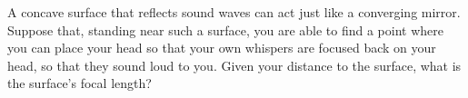 A concave surface that reflects sound waves can act
just like a converging mirror. Suppose that, standing near
such a surface, you are able to find a point where you can
place your head so that your own whispers are focused back
on your head, so that they sound loud to you. Given your
distance to the surface, what is the surface's focal length?
